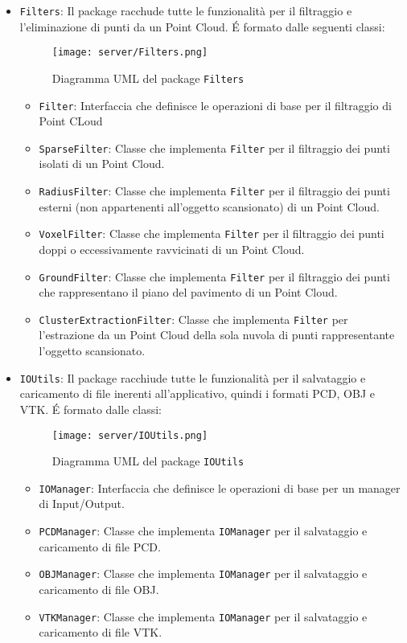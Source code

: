 \begin{itemize}
\item\texttt{Filters}:
	Il package racchude tutte le funzionalità per il filtraggio e l'eliminazione di punti da un Point Cloud. \'E formato dalle seguenti classi:
	\begin{figure}[!h] 
	    \centering 
	    \texttt{[image: server/Filters.png]} 
	    \caption{Diagramma UML del package \texttt{Filters}}
	   \label{fig:Filters}
	\end{figure}
	\begin{itemize}
	\item\texttt{Filter}: Interfaccia che definisce le operazioni di base per il filtraggio di Point CLoud
	\item\texttt{SparseFilter}: Classe che implementa \texttt{Filter} per il filtraggio dei punti isolati di un Point Cloud.
	\item\texttt{RadiusFilter}: Classe che implementa \texttt{Filter} per il filtraggio dei punti esterni (non appartenenti all'oggetto scansionato) di un Point Cloud.
	\item\texttt{VoxelFilter}: Classe che implementa \texttt{Filter} per il filtraggio dei punti doppi o eccessivamente ravvicinati di un Point Cloud.
	\item\texttt{GroundFilter}: Classe che implementa \texttt{Filter} per il filtraggio dei punti che rappresentano il piano del pavimento di un Point Cloud.
	\item\texttt{ClusterExtractionFilter}: Classe che implementa \texttt{Filter} per l'estrazione da un Point Cloud della sola nuvola di punti rappresentante l'oggetto scansionato.
	\end{itemize}

\item\texttt{IOUtils}:
	Il package racchiude tutte le funzionalità per il salvataggio e caricamento di file inerenti all'applicativo, quindi i formati PCD, OBJ e VTK. \'E formato dalle classi:
	\begin{figure}[!h] 
	    \centering 
	    \texttt{[image: server/IOUtils.png]} 
	    \caption{Diagramma UML del package \texttt{IOUtils}}
	   \label{fig:IOUtils}
	\end{figure}
	\begin{itemize}
	\item\texttt{IOManager}: Interfaccia che definisce le operazioni di base per un manager di Input/Output.
	\item\texttt{PCDManager}: Classe che implementa \texttt{IOManager} per il salvataggio e caricamento di file PCD.
	\item\texttt{OBJManager}: Classe che implementa \texttt{IOManager} per il salvataggio e caricamento di file OBJ.
	\item\texttt{VTKManager}: Classe che implementa \texttt{IOManager} per il salvataggio e caricamento di file VTK.
	\end{itemize}
\end{itemize}

